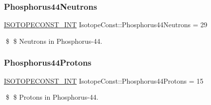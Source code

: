 \subsubsection{\texorpdfstring{Phosphorus44\+Neutrons}{Phosphorus44Neutrons}}
{\footnotesize\ttfamily \mbox{\hyperlink{group___isotope_const-_macros_ga5f18360b3e99483a35c32d789e62621c}{I\+S\+O\+T\+O\+P\+E\+C\+O\+N\+S\+T\+\_\+\+I\+NT}} Isotope\+Const\+::\+Phosphorus44\+Neutrons = 29}

\$ \$ Neutrons in Phosphorus-\/44. \mbox{\label{group___isotope_const-_phosphorus-_p44_ga09f0c5e8c7d167b66ed6ec061b24ab0f}} 
\subsubsection{\texorpdfstring{Phosphorus44\+Protons}{Phosphorus44Protons}}
{\footnotesize\ttfamily \mbox{\hyperlink{group___isotope_const-_macros_ga5f18360b3e99483a35c32d789e62621c}{I\+S\+O\+T\+O\+P\+E\+C\+O\+N\+S\+T\+\_\+\+I\+NT}} Isotope\+Const\+::\+Phosphorus44\+Protons = 15}

\$ \$ Protons in Phosphorus-\/44. 
